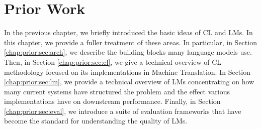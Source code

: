 \chapter{Prior Work}
\label{chap:prior}
In the previous chapter, we briefly introduced the basic ideas of CL and LMs. In this chapter, we provide a fuller treatment of these areas. In particular, in Section \ref{chap:prior:sec:arch}, we describe the building blocks many language models use. Then, in Section \ref{chap:prior:sec:cl}, we give a technical overview of CL methodology focused on its implementations in Machine Translation. In Section \ref{chap:prior:sec:lm}, we provide a technical overview of LMs concentrating on how many current systems have structured the problem and the effect various implementations have on downstream performance.  Finally, in Section \ref{chap:prior:sec:eval}, we introduce a suite of evaluation frameworks that have become the standard for understanding the quality of LMs.



